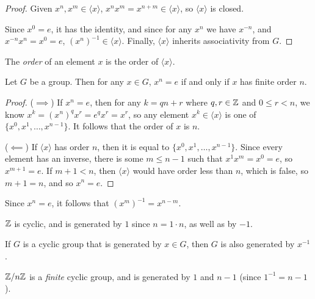 \begin{proof}
    Given $x^n, x^m \in \langle{x}\rangle$, $x^nx^m = x^{n+m} \in \langle{x}\rangle$, so $\langle{x}\rangle$ is closed.

    Since $x^0 = e$, it has the identity, and since for any $x^n$ we have $x^{-n}$, and $x^{-n}x^n = x^0 = e$, $\left(x^n\right)^{-1} \in \langle{x}\rangle$. Finally, $\langle{x}\rangle$ inherits associativity from $G$.
\end{proof}

\begin{defn}
    The \emph{order} of an element $x$ is the order of $\langle{x}\rangle$.
\end{defn}

\begin{prop}
    Let $G$ be a group. Then for any $x \in G$, $x^n = e$ if and only if $x$ has finite order $n$.
\end{prop}

\begin{proof}\proofbreak
    ($\implies$) If $x^n = e$, then for any $k = qn + r$ where $q, r \in \mathbb{Z}$ and $0 \leq r < n$, we know $x^k = (x^n)^qx^r = e^qx^r = x^r$, so any element $x^k \in \langle{x}\rangle$ is one of $\{x^0, x^1, \ldots, x^{n-1}\}$. It follows that the order of $x$ is $n$.

    ($\impliedby$) If $\langle{x}\rangle$ has order $n$, then it is equal to $\{x^0, x^1, \ldots, x^{n-1}\}$. Since every element has an inverse, there is some $m \leq n-1$ such that $x^1x^m = x^0 = e$, so $x^{m+1} = e$. If $m+1 < n$, then $\langle{x}\rangle$ would have order less than $n$, which is false, so $m+1 = n$, and so $x^n = e$.
\end{proof}

\begin{cor}
    Since $x^n = e$, it follows that $\left(x^m\right)^{-1} = x^{n-m}$.
\end{cor}

\begin{exmp}
    $\mathbb{Z}$ is cyclic, and is generated by $1$ since $n = 1 \cdot n$, as well as by $-1$.
\end{exmp}

\begin{rmk}
    If $G$ is a cyclic group that is generated by $x \in G$, then $G$ is also generated by $x^{-1}$.
\end{rmk}

\begin{exmp}
    $\mathbb{Z}/n\mathbb{Z}$ is a \emph{finite} cyclic group, and is generated by $1$ and $n-1$ (since $1^{-1} = n-1$).
\end{exmp}

